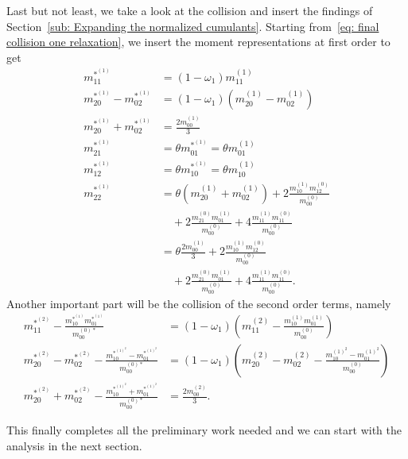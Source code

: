 Last but not least, we take a look at the collision and insert the findings of Section~\ref{sub: Expanding the normalized cumulants}.
Starting from~\eqref{eq: final collision one relaxation}, we insert the moment representations at first order to get
\begin{align}
  \label{eq: collide moments 11_1}
  m_{11}^{*^{(1)}} & = (1-\omega_1) m_{11}^{(1)}
  \\
  \label{eq: collide moments 20m02_1}
  m_{20}^{*^{(1)}} - m_{02}^{*^{(1)}}
  & = (1-\omega_1) (m_{20}^{(1)} - m_{02}^{(1)})
  \\
  \label{eq: collide moments 20p02_1}
  m_{20}^{*^{(1)}} + m_{02}^{*^{(1)}}
  & =  \frac{2 m_{00}^{(1)}}{3}
  \\
  \label{eq: collide moments 21_1}
  m_{21}^{*^{(1)}} & = \theta m_{01}^{*^{(1)}} = \theta m_{01}^{(1)}
  \\
  \label{eq: collide moments 12_1}
  m_{12}^{*^{(1)}} & = \theta m_{10}^{*^{(1)}} = \theta m_{10}^{(1)}
  \\
  \label{eq: collide moments 22_1}
  m_{22}^{*^{(1)}} & =  \theta (m_{20}^{(1)} + m_{02}^{(1)})
  + 2\frac{ m_{10}^{(1)} m_{12}^{(0)} }{m_{00}^{(0)}}
  \\&\quad\nonumber
  + 2\frac{ m_{21}^{(0)} m_{01}^{(1)} }{m_{00}^{(0)}}
  + 4\frac{ m_{11}^{(1)} m_{11}^{(0)} }{m_{00}^{(0)}}
  \\\nonumber
  &= \theta \frac{2 m_{00}^{(1)}}{3} + 2\frac{ m_{10}^{(1)} m_{12}^{(0)} }{m_{00}^{(0)}}
  \\&\quad\nonumber
  + 2\frac{ m_{21}^{(0)} m_{01}^{(1)} }{m_{00}^{(0)}}
  + 4\frac{ m_{11}^{(1)} m_{11}^{(0)} }{m_{00}^{(0)}}.
\end{align}
Another important part will be the collision of the second order terms, namely
\begin{align}
  \label{eq: collide moments 11_2}
  m_{11}^{*^{(2)}} - \frac{ m_{10}^{*^{(1)}}m_{01}^{*^{(1)}}}{m_{00}^{(0)*}} & = (1-\omega_1)\left(m_{11}^{(2)} - \frac{ m_{10}^{(1)}m_{01}^{(1)}}{m_{00}^{(0)}}\right)
  \\
  \label{eq: collide moments 20m02_2}
  m_{20}^{*^{(2)}}-m_{02}^{*^{(2)}} - \frac{ m_{10}^{*^{{(1)}^2}} - m_{01}^{*^{{(1)}^2}}}{m_{00}^{(0)*}} & = (1-\omega_1) \left(m_{20}^{(2)}-m_{02}^{(2)} - \frac{ m_{10}^{{(1)}^2} - m_{01}^{{(1)}^2}}{m_{00}^{(0)}}\right)
  \\
  \label{eq: collide moments 20p02_2}
  m_{20}^{*^{(2)}}+m_{02}^{*^{(2)}} - \frac{ m_{10}^{*^{{(1)}^2}} + m_{01}^{*^{{(1)}^2}}}{m_{00}^{(0)*}} & = \frac{2 m_{00}^{(2)}}{3}.
\end{align}

This finally completes all the preliminary work needed and we can start with the analysis in the next section.
